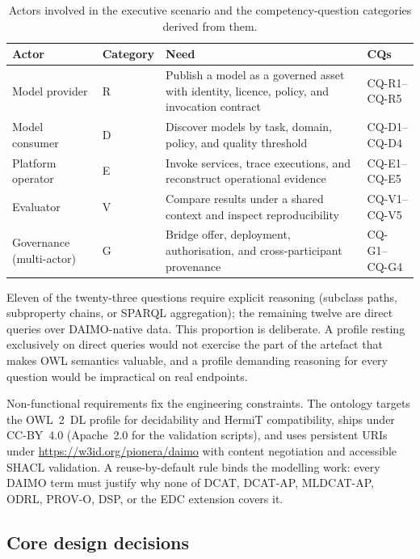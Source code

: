 \documentclass[Afour,sagev,times]{sagej}
\newcommand{\cq}[1]{\textsf{#1}}
\begin{document}
\begin{table}[t]
\small\sf\centering
\caption{Actors involved in the executive scenario and the competency-question categories derived from them.\label{tab:actors}}
\begin{tabular}{@{}p{3.5cm}p{2cm}p{7cm}p{2.5cm}@{}}
\toprule
\textbf{Actor} & \textbf{Category} & \textbf{Need} & \textbf{CQs} \\
\midrule
Model provider & R & Publish a model as a governed asset with identity, licence, policy, and invocation contract & \cq{CQ-R1}--\cq{CQ-R5} \\
Model consumer & D & Discover models by task, domain, policy, and quality threshold & \cq{CQ-D1}--\cq{CQ-D4} \\
Platform operator & E & Invoke services, trace executions, and reconstruct operational evidence & \cq{CQ-E1}--\cq{CQ-E5} \\
Evaluator & V & Compare results under a shared context and inspect reproducibility & \cq{CQ-V1}--\cq{CQ-V5} \\
Governance (multi-actor) & G & Bridge offer, deployment, authorisation, and cross-participant provenance & \cq{CQ-G1}--\cq{CQ-G4} \\
\bottomrule
\end{tabular}
\end{table}

Eleven of the twenty-three questions require explicit reasoning (subclass paths, subproperty chains, or SPARQL aggregation); the remaining twelve are direct queries over DAIMO-native data. This proportion is deliberate. A profile resting exclusively on direct queries would not exercise the part of the artefact that makes OWL semantics valuable, and a profile demanding reasoning for every question would be impractical on real endpoints.

Non-functional requirements fix the engineering constraints. The ontology targets the OWL~2~DL profile for decidability and HermiT compatibility, ships under CC-BY~4.0 (Apache~2.0 for the validation scripts), and uses persistent URIs under \url{https://w3id.org/pionera/daimo} with content negotiation and accessible SHACL validation. A reuse-by-default rule binds the modelling work: every DAIMO term must justify why none of DCAT, DCAT-AP, MLDCAT-AP, ODRL, PROV-O, DSP, or the EDC extension covers it.

\subsection{Core design decisions}\label{sec:method-design}
\end{document}
